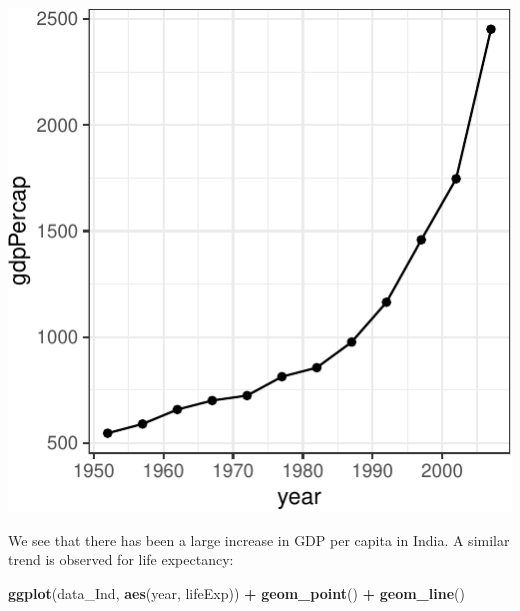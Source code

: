 \documentclass[12pt,]{article}
\newenvironment{Shaded}{\begin{snugshade}}{\end{snugshade}}
\newcommand{\KeywordTok}[1]{\textcolor[rgb]{0.13,0.29,0.53}{\textbf{#1}}}
\newcommand{\StringTok}[1]{\textcolor[rgb]{0.31,0.60,0.02}{#1}}
\newcommand{\OperatorTok}[1]{\textcolor[rgb]{0.81,0.36,0.00}{\textbf{#1}}}
\newcommand{\NormalTok}[1]{#1}
\begin{document}
\begin{center}\includegraphics{Intro_tips_tricks_files/figure-latex/data_Ind_GDP-1} \end{center}

We see that there has been a large increase in GDP per capita in India.
A similar trend is observed for life expectancy:

\begin{Shaded}
\begin{Highlighting}[]
\KeywordTok{ggplot}\NormalTok{(data_Ind, }\KeywordTok{aes}\NormalTok{(year, lifeExp)) }\OperatorTok{+}
\StringTok{  }\KeywordTok{geom_point}\NormalTok{() }\OperatorTok{+}
\StringTok{  }\KeywordTok{geom_line}\NormalTok{() }
\end{Highlighting}
\end{Shaded}
\end{document}
